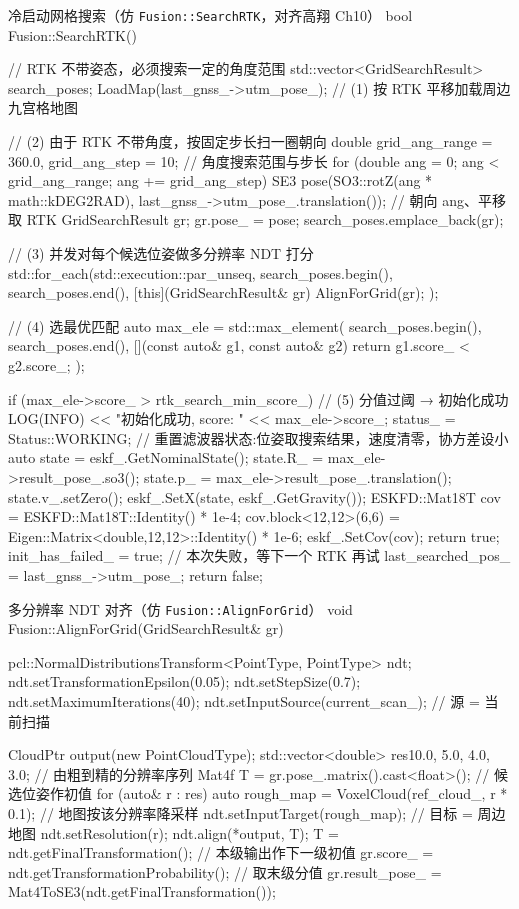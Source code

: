 \begin{codebox}[C++]{冷启动网格搜索（仿 \texttt{Fusion::SearchRTK}，对齐高翔 Ch10）}
bool Fusion::SearchRTK() {
  // RTK 不带姿态，必须搜索一定的角度范围
  std::vector<GridSearchResult> search_poses;
  LoadMap(last_gnss_->utm_pose_);            // (1) 按 RTK 平移加载周边九宫格地图

  // (2) 由于 RTK 不带角度，按固定步长扫一圈朝向
  double grid_ang_range = 360.0, grid_ang_step = 10;     // 角度搜索范围与步长
  for (double ang = 0; ang < grid_ang_range; ang += grid_ang_step) {
    SE3 pose(SO3::rotZ(ang * math::kDEG2RAD),
             last_gnss_->utm_pose_.translation());        // 朝向 ang、平移取 RTK
    GridSearchResult gr; gr.pose_ = pose;
    search_poses.emplace_back(gr);
  }

  // (3) 并发对每个候选位姿做多分辨率 NDT 打分
  std::for_each(std::execution::par_unseq,
                search_poses.begin(), search_poses.end(),
                [this](GridSearchResult& gr) { AlignForGrid(gr); });

  // (4) 选最优匹配
  auto max_ele = std::max_element(
      search_poses.begin(), search_poses.end(),
      [](const auto& g1, const auto& g2) { return g1.score_ < g2.score_; });

  if (max_ele->score_ > rtk_search_min_score_) {   // (5) 分值过阈 → 初始化成功
    LOG(INFO) << "初始化成功, score: " << max_ele->score_;
    status_ = Status::WORKING;
    // 重置滤波器状态:位姿取搜索结果，速度清零，协方差设小
    auto state = eskf_.GetNominalState();
    state.R_ = max_ele->result_pose_.so3();
    state.p_ = max_ele->result_pose_.translation();
    state.v_.setZero();
    eskf_.SetX(state, eskf_.GetGravity());
    ESKFD::Mat18T cov = ESKFD::Mat18T::Identity() * 1e-4;
    cov.block<12,12>(6,6) = Eigen::Matrix<double,12,12>::Identity() * 1e-6;
    eskf_.SetCov(cov);
    return true;
  }
  init_has_failed_ = true;                          // 本次失败，等下一个 RTK 再试
  last_searched_pos_ = last_gnss_->utm_pose_;
  return false;
}
\end{codebox}

\begin{codebox}[C++]{多分辨率 NDT 对齐（仿 \texttt{Fusion::AlignForGrid}）}
void Fusion::AlignForGrid(GridSearchResult& gr) {
  pcl::NormalDistributionsTransform<PointType, PointType> ndt;
  ndt.setTransformationEpsilon(0.05);
  ndt.setStepSize(0.7);
  ndt.setMaximumIterations(40);
  ndt.setInputSource(current_scan_);                 // 源 = 当前扫描

  CloudPtr output(new PointCloudType);
  std::vector<double> res{10.0, 5.0, 4.0, 3.0};      // 由粗到精的分辨率序列
  Mat4f T = gr.pose_.matrix().cast<float>();          // 候选位姿作初值
  for (auto& r : res) {
    auto rough_map = VoxelCloud(ref_cloud_, r * 0.1); // 地图按该分辨率降采样
    ndt.setInputTarget(rough_map);                    // 目标 = 周边地图
    ndt.setResolution(r);
    ndt.align(*output, T);
    T = ndt.getFinalTransformation();                 // 本级输出作下一级初值
  }
  gr.score_ = ndt.getTransformationProbability();     // 取末级分值
  gr.result_pose_ = Mat4ToSE3(ndt.getFinalTransformation());
}
\end{codebox}

